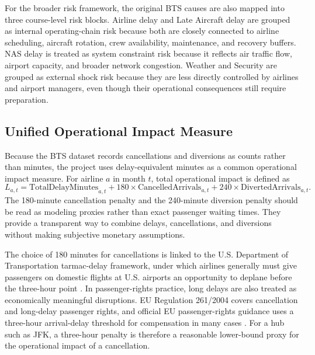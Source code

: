 \documentclass[11pt]{article}
\numberwithin{figure}{section}
\numberwithin{table}{section}
\begin{document}
For the broader risk framework, the original BTS causes are also mapped into three course-level risk blocks. Airline delay and Late Aircraft delay are grouped as internal operating-chain risk because both are closely connected to airline scheduling, aircraft rotation, crew availability, maintenance, and recovery buffers. NAS delay is treated as system constraint risk because it reflects air traffic flow, airport capacity, and broader network congestion. Weather and Security are grouped as external shock risk because they are less directly controlled by airlines and airport managers, even though their operational consequences still require preparation.

\subsection{Unified Operational Impact Measure}

Because the BTS dataset records cancellations and diversions as counts rather than minutes, the project uses delay-equivalent minutes as a common operational impact measure. For airline \(a\) in month \(t\), total operational impact is defined as
\[
L_{a,t} =
\mathrm{TotalDelayMinutes}_{a,t}
+ 180 \times \mathrm{CancelledArrivals}_{a,t}
+ 240 \times \mathrm{DivertedArrivals}_{a,t}.
\]
The 180-minute cancellation penalty and the 240-minute diversion penalty should be read as modeling proxies rather than exact passenger waiting times. They provide a transparent way to combine delays, cancellations, and diversions without making subjective monetary assumptions.

The choice of 180 minutes for cancellations is linked to the U.S. Department of Transportation tarmac-delay framework, under which airlines generally must give passengers on domestic flights at U.S. airports an opportunity to deplane before the three-hour point \cite{dot2025tarmac}. In passenger-rights practice, long delays are also treated as economically meaningful disruptions. EU Regulation 261/2004 covers cancellation and long-delay passenger rights, and official EU passenger-rights guidance uses a three-hour arrival-delay threshold for compensation in many cases \cite{eu2004reg261,euyoureurope2026}. For a hub such as JFK, a three-hour penalty is therefore a reasonable lower-bound proxy for the operational impact of a cancellation.
\end{document}
